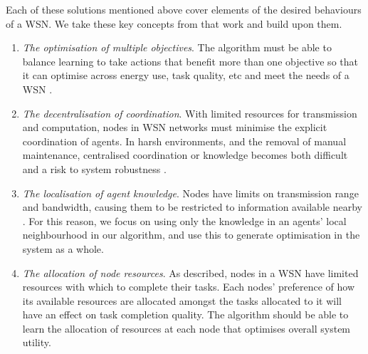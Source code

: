 Each of these solutions mentioned above cover elements of the desired behaviours of a WSN. We take these key concepts from that work and build upon them.
\begin{enumerate}
	\item \textit{The optimisation of multiple objectives}.  The algorithm must be able to balance learning to take actions that benefit more than one objective so that it can optimise across energy use, task quality, etc and meet the needs of a WSN \citep{Guo2019, s150717572, SENGUPTA2013405}.

	\item \textit{The decentralisation of coordination}. With limited resources for transmission and computation, nodes in WSN networks must minimise the explicit coordination of agents.  In harsh environments, and the removal of manual maintenance, centralised coordination or knowledge becomes both difficult and a risk to system robustness \cite{XXX}.
	
	\item \textit{The localisation of agent knowledge}. Nodes have limits on transmission range and bandwidth, causing them to be restricted to information available nearby \citep{10.1007/978-3-642-11814-2_4}. For this reason, we focus on using only the knowledge in an agents' local neighbourhood in our algorithm, and use this to generate optimisation in the system as a whole.
	
	\item \textit{The allocation of node resources}. As described, nodes in a WSN have limited resources with which to complete their tasks. Each nodes' preference of how its available resources are allocated amongst the tasks allocated to it will have an effect on task completion quality. The algorithm should be able to learn the allocation of resources at each node that optimises overall system utility. 
\end{enumerate}

